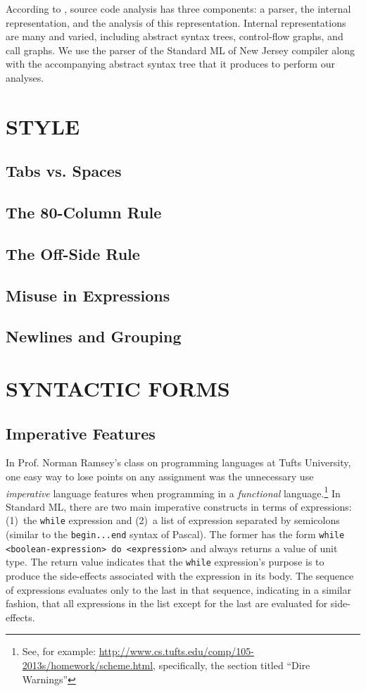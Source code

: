 \documentclass[12pt,abstracton]{scrartcl}
\begin{document}
According to \cite{Bin07}, source code analysis has three components: a parser,
the internal representation, and the analysis of this representation.
Internal representations are many and varied, including abstract syntax trees,
control-flow graphs, and call graphs.
We use the parser of the Standard ML of New Jersey compiler along with the accompanying
abstract syntax tree that it produces to perform our analyses.
\section{STYLE}\label{sec:style}
\subsection{Tabs vs. Spaces}
\subsection{The 80-Column Rule}
\subsection{The Off-Side Rule}
\subsection{Misuse in Expressions}
\subsection{Newlines and Grouping}
\section{SYNTACTIC FORMS}\label{sec:syntax}
\subsection{Imperative Features}\label{subsec:imper}
In Prof. Norman Ramsey's class on programming languages at Tufts University, one easy way to lose points
on any assignment was the unnecessary use \emph{imperative} language features when programming in a \emph{functional} language.\footnote{See, for example: \url{http://www.cs.tufts.edu/comp/105-2013s/homework/scheme.html}, specifically, the section titled ``Dire Warnings''}
In Standard ML, there are two main imperative constructs in terms of expressions:
(1)~the \texttt{while} expression and (2)~a list of expression separated by semicolons (similar to the \texttt{begin...end} syntax of Pascal)\cite{Ull98}.
The former has the form \texttt{while <boolean-expression> do <expression>} and always returns a value of unit type.
The return value indicates that the \texttt{while} expression's purpose is to produce the side-effects associated
with the expression in its body. The sequence of expressions evaluates only to the last in that sequence, indicating
in a similar fashion, that all expressions in the list except for the last are evaluated for side-effects.
\end{document}
